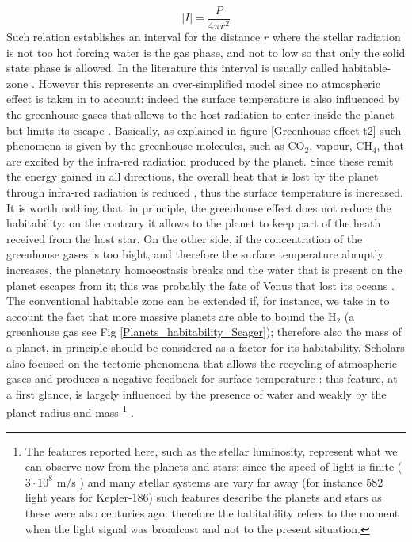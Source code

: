 \documentclass[
12pt, %
a4paper, %
oneside, %
headinclude,footinclude, %
BCOR5mm, %
]{scrartcl}
\begin{document}
\begin{equation}
\lvert I \rvert=\dfrac{P}{4\pi r^{2}}
\end{equation}
Such relation establishes an interval for the distance $r$ where the stellar radiation is not too hot forcing water is the gas phase, and not to low so that only the solid state phase is allowed. In the literature this interval is usually called habitable-zone \cite{kasting1993habitable}. However this represents an over-simplified model since no atmospheric effect is taken in to account: indeed the surface temperature is also influenced by the greenhouse gases that allows to the host radiation to enter inside the planet but limits its escape \cite{seager2013exoplanet,forget2014possible}. Basically, as explained in figure \ref{Greenhouse-effect-t2} such phenomena is given by the greenhouse molecules, such as CO$_{2}$, vapour, CH$_{4}$, that are excited by the infra-red radiation produced by the planet. Since these remit the energy gained in all directions, the overall heat that is lost by the planet through infra-red radiation is reduced \cite{pierrehumbert2011infrared}, thus the surface temperature is increased. It is worth nothing that, in principle, the greenhouse effect does not reduce the habitability: on the contrary it allows to the planet to keep part of the heath received from the host star. On the other side, if the concentration of the greenhouse gases is too hight, and therefore the surface temperature abruptly increases, the planetary homoeostasis\cite{lovelock1974atmospheric,lovelock1982life,caldeira1992life} breaks and the water that is present on the planet escapes from it; this was probably the fate of Venus that lost its oceans \cite{way2016venus,luger2015extreme,seager2013exoplanet}. The conventional habitable zone can be extended if, for instance, we take in to account the fact that more massive planets are able to bound the H$_{2}$ (a greenhouse gas see Fig \ref{Planets_habitability_Seager}); therefore also the mass of a planet, in principle should be considered as a factor for its habitability. Scholars \cite{tackley2012habitable} also focused on the tectonic phenomena that allows the recycling of atmospheric gases and produces a negative feedback for surface temperature \cite{walker1981negative}: this feature, at a first glance, is largely influenced by the presence of water \cite{korenaga2010likelihood,o2007geological} and weakly by the planet radius \cite{o2007geological} and mass \cite{korenaga2010likelihood}\footnote{The features reported here, such as the stellar luminosity, represent what we can observe now from the planets and stars: since the speed of light is finite ($3\cdot10^{8}$ m/s ) and many stellar systems are vary far away (for instance 582 light years for Kepler-186) such features describe the planets and stars as these were also centuries ago: therefore the habitability refers to the moment when the light signal was broadcast and not to the present situation.} .  
  
\end{document}
